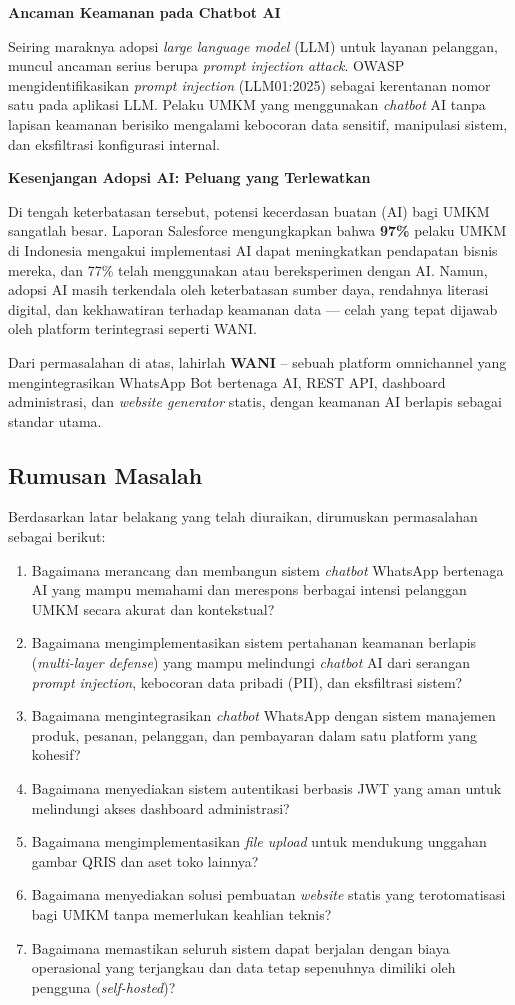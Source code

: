\documentclass[12pt,a4paper,oneside]{article}
\newcommand{\sub}[1]{%
    \subsection{#1}%
}
\begin{document}
\textbf{Ancaman Keamanan pada Chatbot AI}

Seiring maraknya adopsi \textit{large language model} (LLM) untuk layanan pelanggan, muncul ancaman serius berupa \textit{prompt injection attack}. OWASP \cite{owasp2025} mengidentifikasikan \textit{prompt injection} (LLM01:2025) sebagai kerentanan nomor satu pada aplikasi LLM. Pelaku UMKM yang menggunakan \textit{chatbot} AI tanpa lapisan keamanan berisiko mengalami kebocoran data sensitif, manipulasi sistem, dan eksfiltrasi konfigurasi internal.

\textbf{Kesenjangan Adopsi AI: Peluang yang Terlewatkan}

Di tengah keterbatasan tersebut, potensi kecerdasan buatan (AI) bagi UMKM sangatlah besar. Laporan Salesforce \cite{salesforce2025} mengungkapkan bahwa \textbf{97\%} pelaku UMKM di Indonesia mengakui implementasi AI dapat meningkatkan pendapatan bisnis mereka, dan 77\% telah menggunakan atau bereksperimen dengan AI. Namun, adopsi AI masih terkendala oleh keterbatasan sumber daya, rendahnya literasi digital, dan kekhawatiran terhadap keamanan data — celah yang tepat dijawab oleh platform terintegrasi seperti WANI.

Dari permasalahan di atas, lahirlah \textbf{WANI} -- sebuah platform omnichannel yang mengintegrasikan WhatsApp Bot bertenaga AI, REST API, dashboard administrasi, dan \textit{website generator} statis, dengan keamanan AI berlapis sebagai standar utama.

\sub{Rumusan Masalah}

Berdasarkan latar belakang yang telah diuraikan, dirumuskan permasalahan sebagai berikut:

\begin{enumerate}
	\item Bagaimana merancang dan membangun sistem \textit{chatbot} WhatsApp bertenaga AI yang mampu memahami dan merespons berbagai intensi pelanggan UMKM secara akurat dan kontekstual?
	\item Bagaimana mengimplementasikan sistem pertahanan keamanan berlapis (\textit{multi-layer defense}) yang mampu melindungi \textit{chatbot} AI dari serangan \textit{prompt injection}, kebocoran data pribadi (PII), dan eksfiltrasi sistem?
	\item Bagaimana mengintegrasikan \textit{chatbot} WhatsApp dengan sistem manajemen produk, pesanan, pelanggan, dan pembayaran dalam satu platform yang kohesif?
	\item Bagaimana menyediakan sistem autentikasi berbasis JWT yang aman untuk melindungi akses dashboard administrasi?
	\item Bagaimana mengimplementasikan \textit{file upload} untuk mendukung unggahan gambar QRIS dan aset toko lainnya?
	\item Bagaimana menyediakan solusi pembuatan \textit{website} statis yang terotomatisasi bagi UMKM tanpa memerlukan keahlian teknis?
	\item Bagaimana memastikan seluruh sistem dapat berjalan dengan biaya operasional yang terjangkau dan data tetap sepenuhnya dimiliki oleh pengguna (\textit{self-hosted})?
\end{enumerate}
\end{document}
